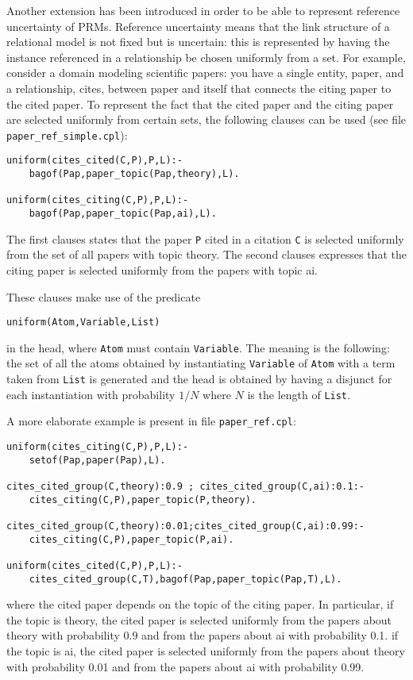 \documentclass[a4paper,12pt]{article}
\begin{document}
Another extension has been introduced in order to be able to represent  reference uncertainty of PRMs. Reference uncertainty means that the link structure of a relational model is not fixed but is uncertain: this is represented by having the instance referenced in a relationship be chosen uniformly from a set. For example, consider a domain modeling scientific papers: you have a single entity, paper, and a relationship, cites, between paper and itself that connects the citing paper to the cited paper. To represent the fact that the cited paper and the citing paper are selected uniformly from certain sets, the following clauses can be used (see file \verb|paper_ref_simple.cpl|):
\begin{verbatim}
uniform(cites_cited(C,P),P,L):-
    bagof(Pap,paper_topic(Pap,theory),L).

uniform(cites_citing(C,P),P,L):-
    bagof(Pap,paper_topic(Pap,ai),L).
\end{verbatim}
The first clauses states that the  paper \texttt{P} cited in a citation \texttt{C} is selected uniformly from the set of all papers with topic theory.
The second clauses expresses that the citing paper is selected uniformly from the papers with
topic ai.

These clauses make use of the predicate
\begin{verbatim}
uniform(Atom,Variable,List)
\end{verbatim}
in the head, where \texttt{Atom} must contain \texttt{Variable}. The meaning is the following: the set of all the atoms obtained by instantiating \texttt{Variable} of \texttt{Atom} with a term taken from \texttt{List} is generated and the head is obtained by having a disjunct for each instantiation with probability $1/N$ where $N$ is the length of \texttt{List}.


A more elaborate example is present in file \verb|paper_ref.cpl|:
\begin{verbatim}
uniform(cites_citing(C,P),P,L):-
    setof(Pap,paper(Pap),L).

cites_cited_group(C,theory):0.9 ; cites_cited_group(C,ai):0.1:-
    cites_citing(C,P),paper_topic(P,theory).

cites_cited_group(C,theory):0.01;cites_cited_group(C,ai):0.99:-
    cites_citing(C,P),paper_topic(P,ai).

uniform(cites_cited(C,P),P,L):-
    cites_cited_group(C,T),bagof(Pap,paper_topic(Pap,T),L).
\end{verbatim}
where the cited paper depends on the topic of the citing paper. In particular, if the topic is theory, the cited paper is selected uniformly  from the papers about theory with probability 0.9 and from the papers about ai with probability 0.1. if the topic is ai, the cited paper is selected uniformly  from the papers about theory with probability 0.01 and from the papers about ai with probability 0.99.
\end{document}
